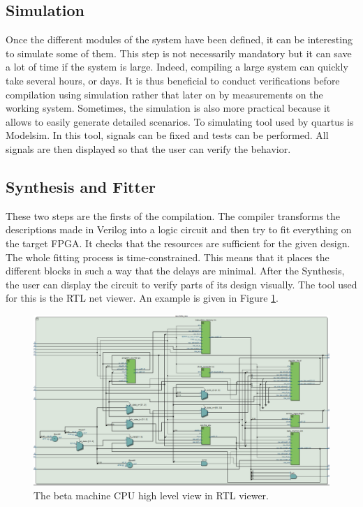 
\subsection{Simulation}

Once the different modules of the system have been defined, it can be interesting to simulate some 
of them. This step is not necessarily mandatory but it can save a lot of time if the system is large. 
Indeed, compiling a large system can quickly take several hours, or days.  It is thus beneficial to
conduct verifications before compilation using simulation rather that later on by measurements on the working 
system. 
Sometimes, the simulation is also more practical because it allows to easily generate detailed 
scenarios. To simulating tool used by quartus is Modelsim. In this tool, signals can be fixed 
and tests can be performed. All signals are then displayed so that the user can verify the 
behavior.

\subsection{Synthesis and Fitter}

These two steps are the firsts of the compilation. The compiler transforms the descriptions made
 in Verilog into a logic circuit and then try to fit everything on the target FPGA. It checks that 
 the resources are sufficient for the given design. The whole fitting process is 
 time-constrained. This means that it places the different blocks in such a way that the delays 
 are minimal. After the Synthesis, the user can display the circuit to verify parts of its design
 visually. The tool used for this is the RTL net viewer. An example is given in Figure 
 \ref{fig:tools/rtl}.

 \begin{figure}[H]
    \centering
    \includegraphics[width=\linewidth]{Chapter2-FPGA_Flow/res/rtl.PNG}
    \caption{The beta machine CPU high level view in RTL viewer.}
    \label{fig:tools/rtl}
\end{figure}

